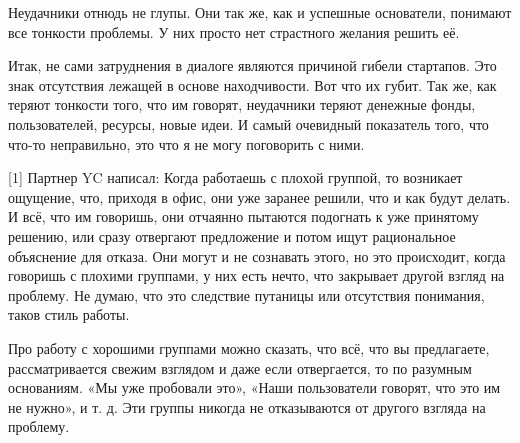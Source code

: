 \documentclass[ebook,12pt,oneside,openany]{memoir}
\begin{document}
Неудачники отнюдь не глупы. Они так же, как и успешные основатели,
понимают все тонкости проблемы. У них просто нет страстного желания
решить её.

Итак, не сами затруднения в диалоге являются причиной гибели
стартапов. Это знак отсутствия лежащей в основе находчивости. Вот что
их губит. Так же, как теряют тонкости того, что им говорят, неудачники
теряют денежные фонды, пользователей, ресурсы, новые идеи. И самый
очевидный показатель того, что что-то неправильно, это что я не могу
поговорить с ними.

[1] Партнер YC написал: Когда работаешь с плохой группой, то возникает
ощущение, что, приходя в офис, они уже заранее решили, что и как будут
делать. И всё, что им говоришь, они отчаянно пытаются подогнать к уже
принятому решению, или сразу отвергают предложение и потом ищут
рациональное объяснение для отказа. Они могут и не сознавать этого, но
это происходит, когда говоришь с плохими группами, у них есть нечто,
что закрывает другой взгляд на проблему. Не думаю, что это следствие
путаницы или отсутствия понимания, таков стиль работы.

Про работу с хорошими группами можно сказать, что всё, что вы
предлагаете, рассматривается свежим взглядом и даже если отвергается,
то по разумным основаниям. «Мы уже пробовали это», «Наши пользователи
говорят, что это им не нужно», и т. д. Эти группы никогда не
отказываются от другого взгляда на проблему.
\end{document}

